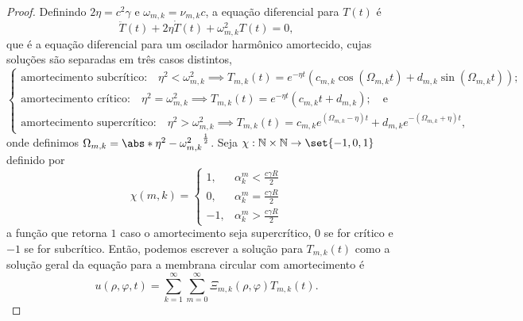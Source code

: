 \begin{proof}
    Definindo \(2 \eta = c^2 \gamma\) e \(\omega_{m,k} = \nu_{m,k} c\), a equação diferencial para \(T(t)\) é
    \begin{equation*}
        \ddot{T}(t) + 2 \eta \dot{T}(t) + \omega_{m,k}^2T(t) = 0,
    \end{equation*}
    que é a equação diferencial para um oscilador harmônico amortecido, cujas soluções são separadas em três casos distintos,
    \begin{equation*}
        \begin{cases}
            \text{amortecimento subcrítico:}\quad \eta^2 < \omega_{m,k}^2 \implies T_{m,k}(t) = e^{-\eta t}\left(c_{m,k} \cos(\Omega_{m,k}t) + d_{m,k}\sin(\Omega_{m,k}t)\right);\\
            \text{amortecimento crítico:}\quad\eta^2 = \omega_{m,k}^2 \implies T_{m,k}(t) = e^{-\eta t}\left(c_{m,k}t + d_{m,k}\right);\quad\text{e}\\
            \text{amortecimento supercrítico:}\quad\eta^2 > \omega_{m,k}^2 \implies T_{m,k}(t) = c_{m,k}e^{(\Omega_{m,k}-\eta)t} + d_{m,k}e^{-(\Omega_{m,k} + \eta)t},
        \end{cases}
    \end{equation*}
    onde definimos \(\Omega_{m,k} = \abs*{\eta^2 - \omega_{m,k}^2}^{\frac12}\). Seja \(\chi : \mathbb{N} \times \mathbb{N} \to \set{-1,0,1}\) definido por
    \begin{equation*}
        \chi(m,k) = \begin{cases}
            1,& \alpha_k^m < \frac{c \gamma R}{2}\\
            0,& \alpha_k^m = \frac{c \gamma R}{2}\\
            -1,& \alpha_k^m > \frac{c \gamma R}{2}
        \end{cases}
    \end{equation*}
    a função que retorna \(1\) caso o amortecimento seja supercrítico, \(0\) se for crítico e \(-1\) se for subcrítico. Então, podemos escrever a solução para \(T_{m,k}(t)\) como a solução geral da equação para a membrana circular com amortecimento é
    \begin{equation*}
        u(\rho, \varphi, t) = \sum_{k = 1}^\infty \sum_{m = 0}^\infty \Xi_{m,k}(\rho, \varphi)T_{m,k}(t).
    \end{equation*}
\end{proof}
